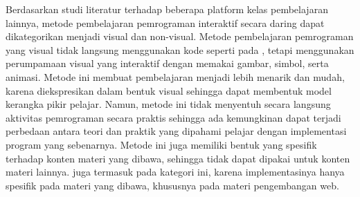 


Berdasarkan studi literatur terhadap beberapa platform kelas pembelajaran lainnya, metode pembelajaran pemrograman interaktif secara daring dapat dikategorikan menjadi visual dan non-visual. Metode pembelajaran pemrograman yang visual tidak langsung menggunakan kode seperti pada \textcite{brilliant2021media}, tetapi menggunakan perumpamaan visual yang interaktif dengan memakai gambar, simbol, serta animasi. Metode ini membuat pembelajaran menjadi lebih menarik dan mudah, karena diekspresikan dalam bentuk visual sehingga dapat membentuk model kerangka pikir pelajar. Namun, metode ini tidak menyentuh secara langsung aktivitas pemrograman secara praktis sehingga ada kemungkinan dapat terjadi perbedaan antara teori dan praktik yang dipahami pelajar dengan implementasi program yang sebenarnya. Metode ini juga memiliki bentuk yang spesifik terhadap konten materi yang dibawa, sehingga tidak dapat dipakai untuk konten materi lainnya. \textcite{froggy2021media} juga termasuk pada kategori ini, karena implementasinya hanya spesifik pada materi yang dibawa, khususnya pada materi pengembangan web.

